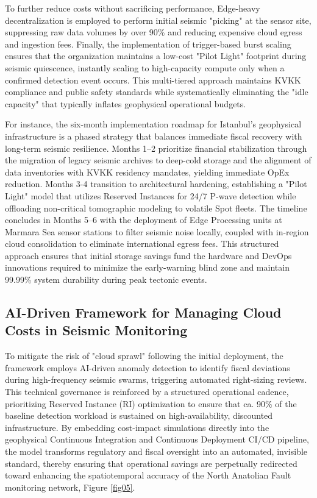 \documentclass[data,article,submit,pdftex,moreauthors]{Definitions/mdpi}
\begin{document}
To further reduce costs without sacrificing performance, Edge-heavy decentralization is employed to perform initial seismic "picking" at the sensor site, suppressing raw data volumes by over 90\% and reducing expensive cloud egress and ingestion fees. Finally, the implementation of trigger-based burst scaling ensures that the organization maintains a low-cost "Pilot Light" footprint during seismic quiescence, instantly scaling to high-capacity compute only when a confirmed detection event occurs. This multi-tiered approach maintains KVKK compliance and public safety standards while systematically eliminating the "idle capacity" that typically inflates geophysical operational budgets.

For instance, the six-month implementation roadmap for Istanbul’s geophysical infrastructure is a phased strategy that balances immediate fiscal recovery with long-term seismic resilience. Months 1–2 prioritize financial stabilization through the migration of legacy seismic archives to deep-cold storage and the alignment of data inventories with KVKK residency mandates, yielding immediate OpEx reduction. Months 3-4 transition to architectural hardening, establishing a "Pilot Light" model that utilizes Reserved Instances for 24/7 P-wave detection while offloading non-critical tomographic modeling to volatile Spot fleets. The timeline concludes in Months 5–6 with the deployment of Edge Processing units at Marmara Sea sensor stations to filter seismic noise locally, coupled with in-region cloud consolidation to eliminate international egress fees. This structured approach ensures that initial storage savings fund the hardware and DevOps innovations required to minimize the early-warning blind zone and maintain 99.99\% system durability during peak tectonic events.

\subsection{AI-Driven Framework for Managing Cloud Costs in Seismic Monitoring}
To mitigate the risk of "cloud sprawl" following the initial deployment, the framework employs AI-driven anomaly detection to identify fiscal deviations during high-frequency seismic swarms, triggering automated right-sizing reviews. This technical governance is reinforced by a structured operational cadence, prioritizing Reserved Instance (RI) optimization to ensure that ca. 90\% of the baseline detection workload is sustained on high-availability, discounted infrastructure. By embedding cost-impact simulations directly into the geophysical Continuous Integration and Continuous Deployment CI/CD pipeline, the model transforms regulatory and fiscal oversight into an automated, invisible standard, thereby ensuring that operational savings are perpetually redirected toward enhancing the spatiotemporal accuracy of the North Anatolian Fault monitoring network, Figure \ref{fig05}.
\end{document}
